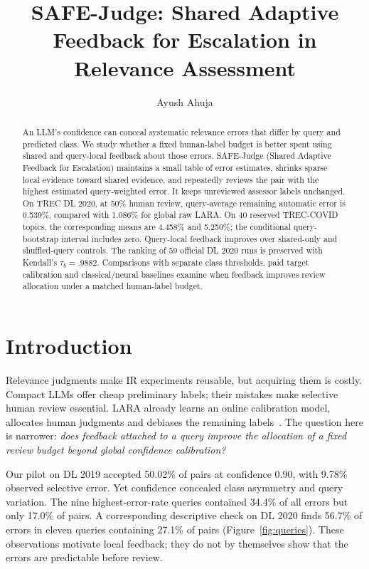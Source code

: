 \documentclass[sigconf,nonacm]{acmart}
\title[SAFE-Judge]{SAFE-Judge: Shared Adaptive Feedback for Escalation in Relevance Assessment}
\author{Ayush Ahuja}
\affiliation{\institution{Indian Institute of Technology Delhi}\city{New Delhi}\country{India}}
\begin{document}
\begin{abstract}
An LLM's confidence can conceal systematic relevance errors that differ by query
and predicted class. We study whether a fixed human-label budget is better spent
using shared and query-local feedback about those errors. SAFE-Judge (Shared Adaptive Feedback for Escalation) maintains a
small table of error estimates, shrinks sparse local evidence toward shared
evidence, and repeatedly reviews the pair with the highest estimated query-weighted
error. It keeps unreviewed assessor labels unchanged. On TREC DL 2020, at 50\%
human review, query-average remaining automatic error is 0.539\%, compared with
1.086\% for global raw LARA. On 40 reserved TREC-COVID topics, the corresponding
means are 4.458\% and 5.250\%; the conditional query-bootstrap interval includes
zero. Query-local feedback improves over shared-only and shuffled-query controls.
The ranking of 59 official DL 2020 runs is preserved with Kendall's
$\tau_b=.9882$. Comparisons with separate class thresholds, paid target
calibration and classical/neural baselines examine when feedback improves
review allocation under a matched human-label budget.
\end{abstract}
\maketitle

\section{Introduction}
Relevance judgments make IR experiments reusable, but acquiring them is costly.
Compact LLMs offer cheap preliminary labels; their mistakes make selective human
review essential. LARA already learns an online calibration model, allocates
human judgments and debiases the remaining labels~\cite{lara}. The question here
is narrower: \emph{does feedback attached to a query improve the allocation of a
fixed review budget beyond global confidence calibration?}

Our pilot on DL 2019 accepted 50.02\% of pairs at confidence 0.90, with 9.78\%
observed selective error. Yet confidence concealed class asymmetry and query
variation. The nine highest-error-rate queries contained 34.4\% of all errors
but only 17.0\% of pairs. A corresponding descriptive check on DL 2020 finds
56.7\% of errors in eleven queries containing 27.1\% of pairs
(Figure~\ref{fig:queries}). These observations motivate local feedback; they do
not by themselves show that the errors are predictable before review.
\end{document}
